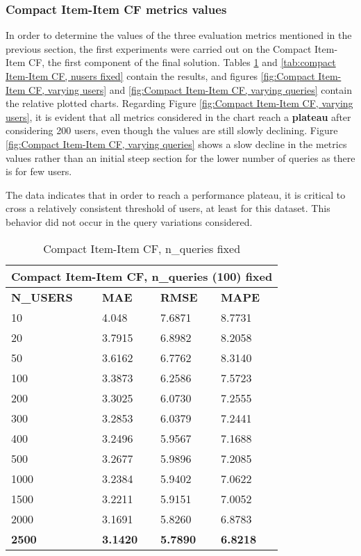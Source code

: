 \subsubsection{Compact Item-Item CF metrics values}

In order to determine the values of the three evaluation metrics mentioned in the previous section, the first experiments were carried out on the Compact Item-Item CF, the first component of the final solution.
Tables \ref{tab:compact Item-Item CF, nqueries fixed} and \ref{tab:compact Item-Item CF, nusers fixed} contain the results, and figures \ref{fig:Compact Item-Item CF, varying users} and \ref{fig:Compact Item-Item CF, varying queries} contain the relative plotted charts.
Regarding Figure \ref{fig:Compact Item-Item CF, varying users}, it is evident that all metrics considered in the chart reach a \textbf{plateau} after considering 200 users, even though the values are still slowly declining.
Figure \ref{fig:Compact Item-Item CF, varying queries} shows a slow decline in the metrics values rather than an initial steep section for the lower number of queries as there is for few users.

The data indicates that in order to reach a performance plateau, it is critical to cross a relatively consistent threshold of users, at least for this dataset. This behavior did not occur in the query variations considered.

\begin{table}[h!]
    \centering
    \begin{tabular}{ |p{2cm}||p{1.5cm}|p{1.5cm}|p{1.5cm}|  }
         \hline
         \multicolumn{4}{|c|}{Compact Item-Item CF, n\_queries (100) fixed } \\
         \hline
         \textbf{N\_USERS}& \textbf{MAE} &\textbf{RMSE} &\textbf{MAPE}\\
         \hline
         10 & 4.048 &  7.6871 & 8.7731\\
         20 & 3.7915 & 6.8982 & 8.2058\\
         50 & 3.6162 & 6.7762 & 8.3140\\
         100 & 3.3873 & 6.2586 & 7.5723\\
         200 & 3.3025 & 6.0730 & 7.2555\\
         300 & 3.2853 & 6.0379 & 7.2441\\
         400 & 3.2496 & 5.9567 & 7.1688\\
         500 & 3.2677 & 5.9896 & 7.2085\\
         1000 & 3.2384 & 5.9402 & 7.0622\\
         1500 & 3.2211 & 5.9151 & 7.0052\\ 
         2000 & 3.1691 & 5.8260 & 6.8783\\
         \textbf{2500} & \textbf{3.1420} & \textbf{5.7890} & \textbf{6.8218}\\
         
     
         \hline
    \end{tabular}
    \caption{Compact Item-Item CF, n\_queries fixed}
    \label{tab:compact Item-Item CF, nqueries fixed}
\end{table}


